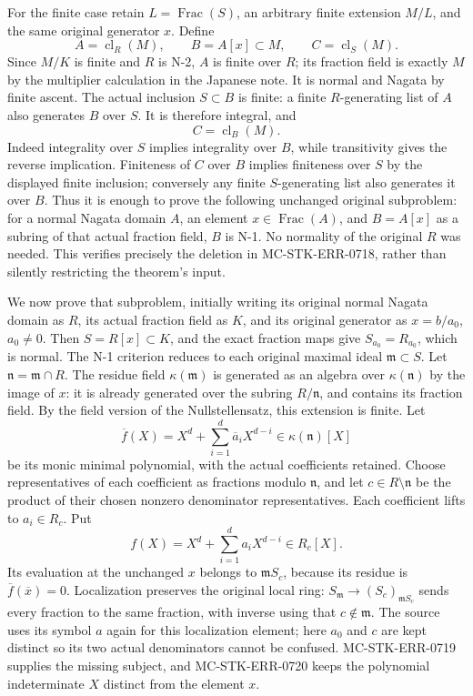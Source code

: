 For the finite case retain \(L=\operatorname{Frac}(S)\), an arbitrary finite extension \(M/L\), and the same original generator \(x\). Define \[
 A=\operatorname{cl}_R(M),\qquad B=A[x]\subset M,
 \qquad C=\operatorname{cl}_S(M).
\] Since \(M/K\) is finite and \(R\) is N-2, \(A\) is finite over \(R\); its fraction field is exactly \(M\) by the multiplier calculation in the Japanese note. It is normal and Nagata by finite ascent. The actual inclusion \(S\subset B\) is finite: a finite \(R\)-generating list of \(A\) also generates \(B\) over \(S\). It is therefore integral, and \[
 C=\operatorname{cl}_B(M).
\] Indeed integrality over \(S\) implies integrality over \(B\), while transitivity gives the reverse implication. Finiteness of \(C\) over \(B\) implies finiteness over \(S\) by the displayed finite inclusion; conversely any finite \(S\)-generating list also generates it over \(B\). Thus it is enough to prove the following unchanged original subproblem: for a normal Nagata domain \(A\), an element \(x\in\operatorname{Frac}(A)\), and \(B=A[x]\) as a subring of that actual fraction field, \(B\) is N-1. No normality of the original \(R\) was needed. This verifies precisely the deletion in MC-\AlgebraIdentifierBreak{}STK-\AlgebraIdentifierBreak{}ERR-\AlgebraIdentifierBreak{}0718, rather than silently restricting the theorem's input.

We now prove that subproblem, initially writing its original normal Nagata domain as \(R\), its actual fraction field as \(K\), and its original generator as \(x=b/a_0\), \(a_0\ne0\). Then \(S=R[x]\subset K\), and the exact fraction maps give \(S_{a_0}=R_{a_0}\), which is normal. The N-1 criterion reduces to each original maximal ideal \(\mathfrak m\subset S\). Let \(\mathfrak n=\mathfrak m\cap R\). The residue field \(\kappa(\mathfrak m)\) is generated as an algebra over \(\kappa(\mathfrak n)\) by the image of \(x\): it is already generated over the subring \(R/\mathfrak n\), and contains its fraction field. By the field version of the Nullstellensatz, this extension is finite. Let \[
 \overline f(X)=X^d+\sum_{i=1}^{d}\overline a_iX^{d-i}
 \in\kappa(\mathfrak n)[X]
\] be its monic minimal polynomial, with the actual coefficients retained. Choose representatives of each coefficient as fractions modulo \(\mathfrak n\), and let \(c\in R\setminus\mathfrak n\) be the product of their chosen nonzero denominator representatives. Each coefficient lifts to \(a_i\in R_c\). Put \[
 f(X)=X^d+\sum_{i=1}^{d}a_iX^{d-i}\in R_c[X].
\] Its evaluation at the unchanged \(x\) belongs to \(\mathfrak mS_c\), because its residue is \(\overline f(\overline x)=0\). Localization preserves the original local ring: \(S_{\mathfrak m}\to(S_c)_{\mathfrak mS_c}\) sends every fraction to the same fraction, with inverse using that \(c\notin\mathfrak m\). The source uses its symbol \(a\) again for this localization element; here \(a_0\) and \(c\) are kept distinct so its two actual denominators cannot be confused. MC-\AlgebraIdentifierBreak{}STK-\AlgebraIdentifierBreak{}ERR-\AlgebraIdentifierBreak{}0719 supplies the missing subject, and MC-\AlgebraIdentifierBreak{}STK-\AlgebraIdentifierBreak{}ERR-\AlgebraIdentifierBreak{}0720 keeps the polynomial indeterminate \(X\) distinct from the element \(x\).

